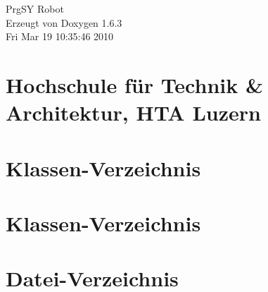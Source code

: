 \documentclass[a4paper]{book}
\begin{document}
\hypersetup{pageanchor=false}
\begin{titlepage}
\vspace*{7cm}
\begin{center}
{\Large PrgSY Robot }\\
\vspace*{1cm}
{\large Erzeugt von Doxygen 1.6.3}\\
\vspace*{0.5cm}
{\small Fri Mar 19 10:35:46 2010}\\
\end{center}
\end{titlepage}
\clearemptydoublepage
{}
\tableofcontents
\clearemptydoublepage
{}
\hypersetup{pageanchor=true}
\chapter{Hochschule f\"{u}r Technik \& Architektur, HTA Luzern}
\label{index}\hypertarget{index}{}
\chapter{Klassen-\/Verzeichnis}

\chapter{Klassen-\/Verzeichnis}

\chapter{Datei-\/Verzeichnis}

\end{document}
